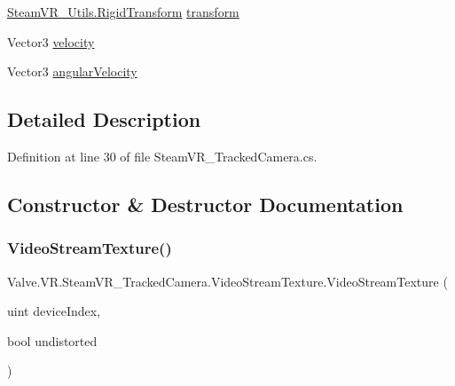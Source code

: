 \begin{DoxyCompactItemize}
\item 
\mbox{\hyperlink{struct_valve_1_1_v_r_1_1_steam_v_r___utils_1_1_rigid_transform}{Steam\+V\+R\+\_\+\+Utils.\+Rigid\+Transform}} \mbox{\hyperlink{class_valve_1_1_v_r_1_1_steam_v_r___tracked_camera_1_1_video_stream_texture_ab7ec00ab97aa0173682d74f9dc9731e7}{transform}}
\item 
Vector3 \mbox{\hyperlink{class_valve_1_1_v_r_1_1_steam_v_r___tracked_camera_1_1_video_stream_texture_af0f569f63ee5e5dedbe5e0e28ac8388e}{velocity}}
\item 
Vector3 \mbox{\hyperlink{class_valve_1_1_v_r_1_1_steam_v_r___tracked_camera_1_1_video_stream_texture_a442e62b0ad11af50d02a113036871326}{angular\+Velocity}}
\end{DoxyCompactItemize}


\subsection{Detailed Description}


Definition at line 30 of file Steam\+V\+R\+\_\+\+Tracked\+Camera.\+cs.



\subsection{Constructor \& Destructor Documentation}
\mbox{\label{class_valve_1_1_v_r_1_1_steam_v_r___tracked_camera_1_1_video_stream_texture_a3698416efc663ab4a07bdf2c7778a235}} 
\subsubsection{\texorpdfstring{VideoStreamTexture()}{VideoStreamTexture()}}
{\footnotesize\ttfamily Valve.\+V\+R.\+Steam\+V\+R\+\_\+\+Tracked\+Camera.\+Video\+Stream\+Texture.\+Video\+Stream\+Texture (\begin{DoxyParamCaption}\item[{uint}]{device\+Index,  }\item[{bool}]{undistorted }\end{DoxyParamCaption})}



